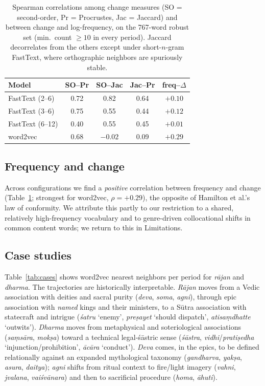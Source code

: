 \documentclass[11pt]{article}
\begin{document}
\begin{table}[t]
\centering
\small
\begin{tabular}{lcccc}
\toprule
\textbf{Model} & \textbf{SO--Pr} & \textbf{SO--Jac} & \textbf{Jac--Pr} & \textbf{freq--$\Delta$} \\
\midrule
FastText (2--6)  & 0.72 & 0.82 & 0.64 & $+0.10$ \\
FastText (3--6)  & 0.75 & 0.55 & 0.44 & $+0.12$ \\
FastText (6--12) & 0.40 & 0.55 & 0.45 & $+0.01$ \\
word2vec         & 0.68 & $-0.02$ & 0.09 & $+0.29$ \\
\bottomrule
\end{tabular}
\caption{Spearman correlations among change measures (SO = second-order, Pr = Procrustes, Jac = Jaccard) and between change and log-frequency, on the 767-word robust set (min.\ count $\ge 10$ in every period). Jaccard decorrelates from the others except under short-$n$-gram FastText, where orthographic neighbors are spuriously stable.}
\label{tab:metrics}
\end{table}

\subsection{Frequency and change}
Across configurations we find a \emph{positive} correlation between frequency and change (Table~\ref{tab:metrics}; strongest for word2vec, $\rho=+0.29$), the opposite of Hamilton et al.'s law of conformity. We attribute this partly to our restriction to a shared, relatively high-frequency vocabulary and to genre-driven collocational shifts in common content words; we return to this in Limitations.

\subsection{Case studies}
\label{sec:cases}
Table~\ref{tab:cases} shows word2vec nearest neighbors per period for \textit{r\=ajan} and \textit{dharma}. The trajectories are historically interpretable. \textit{R\=ajan} moves from a Vedic association with deities and sacral purity (\textit{deva}, \textit{soma}, \textit{agni}), through epic association with \emph{named} kings and their ministers, to a S\=utra association with statecraft and intrigue (\textit{\'satru} `enemy', \textit{pre\d{s}ayet} `should dispatch', \textit{atisa\d{m}dhatte} `outwits'). \textit{Dharma} moves from metaphysical and soteriological associations (\textit{sa\d{m}s\=ara}, \textit{mok\d{s}a}) toward a technical legal-\'s\=astric sense (\textit{\'s\=astra}, \textit{vidhi}/\textit{prati\d{s}edha} `injunction/prohibition', \textit{\=ac\=ara} `conduct'). \textit{Deva} comes, in the epics, to be defined relationally against an expanded mythological taxonomy (\textit{gandharva}, \textit{yak\d{s}a}, \textit{asura}, \textit{daitya}); \textit{agni} shifts from ritual context to fire/light imagery (\textit{vahni}, \textit{jvalana}, \textit{vai\'sv\=anara}) and then to sacrificial procedure (\textit{homa}, \textit{\=ahuti}).
\end{document}
